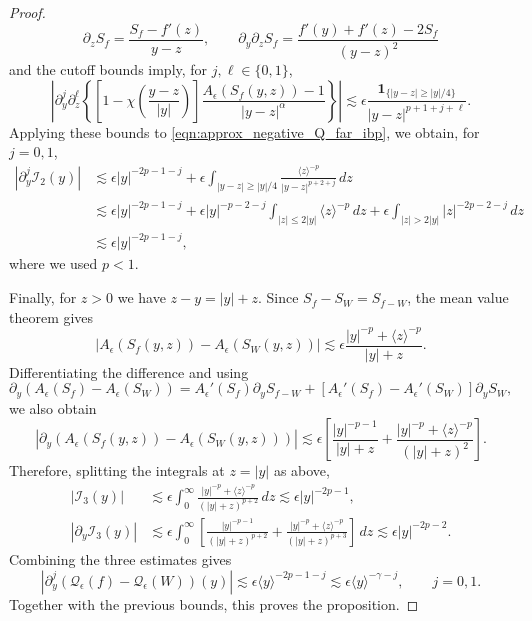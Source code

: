 \documentclass[11pt]{amsart}
\theoremstyle{definition}
\theoremstyle{remark}
\numberwithin{equation}{section}
\newcommand{\mc}[1]{\mathcal{#1}}
\newcommand{\ang}[1]{\langle #1 \rangle}
\begin{document}
\begin{proof}
\[        \partial_z S_f=\frac{S_f-f'(z)}{y-z},\qquad
        \partial_y\partial_z S_f=\frac{f'(y)+f'(z)-2S_f}{(y-z)^2}
    \]
    and the cutoff bounds imply, for $j,\ell\in\{0,1\}$,
    \[
        \left|\partial_y^j\partial_z^\ell\left\{
        \left[1-\chi\left(\frac{y-z}{|y|}\right)\right]
        \frac{A_\epsilon(S_f(y,z))-1}{|y-z|^\alpha}\right\}\right|
        \lesssim\epsilon\frac{\mathbf{1}_{\{|y-z|\geq|y|/4\}}}
        {|y-z|^{p+1+j+\ell}}.
    \]
    Applying these bounds to \eqref{eqn:approx_negative_Q_far_ibp}, we obtain, for $j=0,1$,
    \begin{align*}
        |\partial_y^j\mc{I}_2(y)|
        &\lesssim\epsilon |y|^{-2p-1-j}
        +\epsilon\int_{|y-z|\geq|y|/4}
        \frac{\ang{z}^{-p}}{|y-z|^{p+2+j}}\,dz\\
        &\lesssim\epsilon |y|^{-2p-1-j}
        +\epsilon |y|^{-p-2-j}\int_{|z|\leq2|y|}\ang{z}^{-p}\,dz
        +\epsilon\int_{|z|>2|y|}|z|^{-2p-2-j}\,dz\\
        &\lesssim\epsilon |y|^{-2p-1-j},
    \end{align*}
    where we used $p<1$. \par
    Finally, for $z>0$ we have $z-y=|y|+z$. Since $S_f-S_W=S_{f-W}$, the mean value theorem gives
    \[
        |A_\epsilon(S_f(y,z))-A_\epsilon(S_W(y,z))|
        \lesssim\epsilon\frac{|y|^{-p}+\ang{z}^{-p}}{|y|+z}.
    \]
    Differentiating the difference and using
    \[
        \partial_y(A_\epsilon(S_f)-A_\epsilon(S_W))
        =A_\epsilon'(S_f)\partial_y S_{f-W}
        +[A_\epsilon'(S_f)-A_\epsilon'(S_W)]\partial_y S_W,
    \]
    we also obtain
    \[
        |\partial_y(A_\epsilon(S_f(y,z))-A_\epsilon(S_W(y,z)))|
        \lesssim\epsilon\left[
        \frac{|y|^{-p-1}}{|y|+z}
        +\frac{|y|^{-p}+\ang{z}^{-p}}{(|y|+z)^2}\right].
    \]
    Therefore, splitting the integrals at $z=|y|$ as above,
    \begin{align*}
        |\mc{I}_3(y)|
        &\lesssim\epsilon\int_0^\infty
        \frac{|y|^{-p}+\ang{z}^{-p}}{(|y|+z)^{p+2}}\,dz
        \lesssim\epsilon |y|^{-2p-1},\\
        |\partial_y\mc{I}_3(y)|
        &\lesssim\epsilon\int_0^\infty\left[
        \frac{|y|^{-p-1}}{(|y|+z)^{p+2}}
        +\frac{|y|^{-p}+\ang{z}^{-p}}{(|y|+z)^{p+3}}\right]\,dz
        \lesssim\epsilon |y|^{-2p-2}.
    \end{align*}
    Combining the three estimates gives
    \begin{equation}\label{eqn:approx_negative_Q_difference_bound}
        |\partial_y^j(\mc{Q}_\epsilon(f)-\mc{Q}_\epsilon(W))(y)|
        \lesssim\epsilon\ang{y}^{-2p-1-j}
        \lesssim\epsilon\ang{y}^{-\gamma-j},\qquad j=0,1.
    \end{equation}
    Together with the previous bounds, this proves the proposition.
\end{proof}
\end{document}
